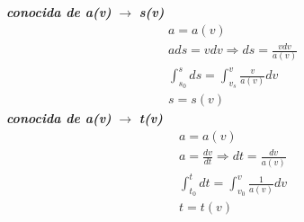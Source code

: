 \textbf{\textit{conocida de a(v) }} $ \rightarrow $ \textbf{\textit{s(v)}}
\begin{gather*}
	a=a(v) \\
	ads=vdv \Rightarrow ds=\frac{vdv}{a(v)} \\
	\int_{s_0}^{s}ds=\int_{v_s}^{v}\frac{v}{a(v)}dv \\
	s=s(v)
\end{gather*}
\textbf{\textit{conocida de a(v) }} $ \rightarrow $ \textbf{\textit{t(v)}}
\begin{gather*}
	a=a(v) \\
	a=\frac{dv}{dt} \Rightarrow dt=\frac{dv}{a(v)} \\
	\int_{t_0}^{t}dt=\int_{v_0}^{v}\frac{1}{a(v)}dv \\
	t=t(v)
\end{gather*}